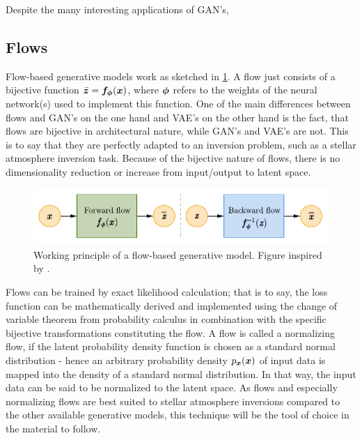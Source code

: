 \documentclass[a4paper,11pt]{report}
\def\fc#1{{\color{black}{#1}}} %
\begin{document}
Despite the many interesting applications of GAN's, \fc{it is very challenging to use them for stellar atmosphere inversion purposes, since they do not suit the problem at hand.}

\subsection{Flows}
Flow-based generative models work as sketched in \cref{fig:Flow}. A flow just consists of a bijective function $\bar{\bm{z}} = \bm{f}_{\bm{\phi}}(\bm{x})$, where $\bm{\phi}$ refers to the weights of the neural network(s) used to implement this function. One of the main differences between flows and GAN's on the one hand and VAE's on the other hand is the fact, that flows are bijective in architectural nature, while GAN's and VAE's are not. This is to say that they are perfectly adapted to an inversion problem, such as a stellar atmosphere inversion task. Because of the bijective nature of flows, there is no dimensionality reduction or increase from input/output to latent space.
\begin{figure}[h!]
\centering
\includegraphics[width=\linewidth-4cm]{figures/Flow.pdf}
\caption{Working principle of a flow-based generative model. Figure inspired by \cite{weng2018flow}.}
\label{fig:Flow}
\end{figure}

Flows can be trained by exact likelihood calculation; that is to say, the loss function can be mathematically derived and implemented using the change of variable theorem from probability calculus in combination with the specific bijective transformations constituting the flow. A flow is called a normalizing flow, if the latent probability density function is chosen as a standard normal distribution - hence an arbitrary probability density $p_{\bm{x}}(\bm{x})$ of input data is mapped into the density of a standard normal distribution. In that way, the input data can be said to be normalized to the latent space. As flows and especially normalizing flows are best suited to stellar atmosphere inversions compared to the other available generative models, this technique will be the tool of choice in the material to follow.
\end{document}
